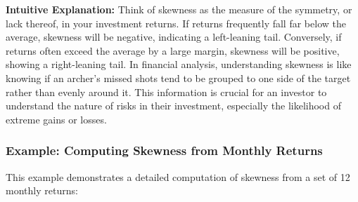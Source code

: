 \documentclass{article}
\begin{document}
\textbf{Intuitive Explanation:} 
Think of skewness as the measure of the symmetry, or lack thereof, in your investment returns. If returns frequently fall far below the average, skewness will be negative, indicating a left-leaning tail. Conversely, if returns often exceed the average by a large margin, skewness will be positive, showing a right-leaning tail. In financial analysis, understanding skewness is like knowing if an archer's missed shots tend to be grouped to one side of the target rather than evenly around it. This information is crucial for an investor to understand the nature of risks in their investment, especially the likelihood of extreme gains or losses.

\subsubsection{Example: Computing Skewness from Monthly Returns}

This example demonstrates a detailed computation of skewness from a set of 12 monthly returns:
\end{document}
